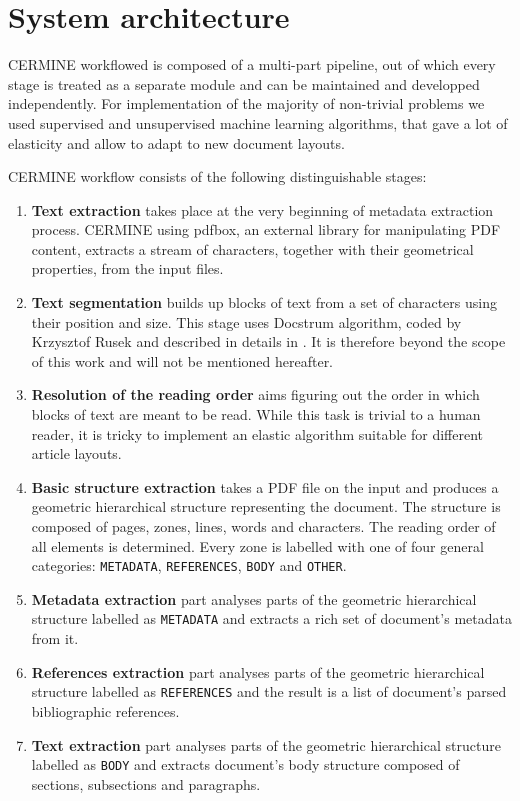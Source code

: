 \chapter{System architecture}
CERMINE workflowed is composed of a multi-part pipeline, out of which every stage is treated as a separate module and can be maintained and developped independently. For implementation of the majority of non-trivial problems we used supervised and unsupervised machine learning algorithms, that gave a lot of elasticity and allow to adapt to new document layouts.

\quad
CERMINE workflow consists of the following distinguishable stages:
\begin{enumerate}
    \item \textbf{Text extraction} takes place at the very beginning of metadata extraction process. CERMINE using pdfbox, an external library for manipulating PDF content, extracts a stream of characters, together with their geometrical properties, from the input files.
    \item \textbf{Text segmentation} builds up blocks of text from a set of characters using their position and size. This stage uses Docstrum algorithm, coded by Krzysztof Rusek and described in details in \cite{O'Gorman1993}. It is therefore beyond the scope of this work and will not be mentioned hereafter.
    \item \textbf{Resolution of the reading order} aims figuring out the order in which blocks of text are meant to be read. While this task is trivial to a human reader, it is tricky to implement an elastic algorithm suitable for different article layouts.
    \item \textbf{Basic structure extraction} takes a PDF file on the input and produces a geometric hierarchical structure representing the document. The structure is composed of pages, zones, lines, words and characters. The reading order of all elements is determined. Every zone is labelled with one of four general categories: \verb+METADATA+, \verb+REFERENCES+, \verb+BODY+ and \verb+OTHER+.
    \item \textbf{Metadata extraction} part analyses parts of the geometric hierarchical structure labelled as \verb+METADATA+ and extracts a rich set of document's metadata from it.
    \item \textbf{References extraction} part analyses parts of the geometric hierarchical structure labelled as \verb+REFERENCES+ and the result is a list of document's parsed bibliographic references.
    \item \textbf{Text extraction} part analyses parts of the geometric hierarchical structure labelled as \verb+BODY+ and extracts document's body structure composed of sections, subsections and paragraphs. 
\end{enumerate}
